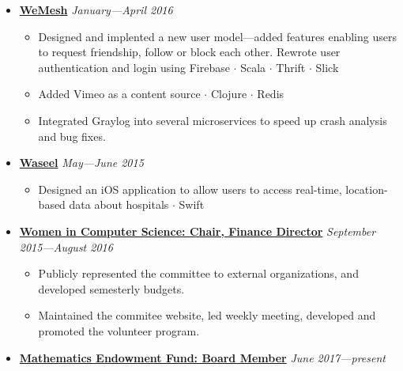 \documentclass[7pt,letterpaper]{article}
\newcommand{\dt}{$\cdot$ }
\begin{document}
\begin{itemize}
    \item[]
    {\href{http://www.rave.io}{\textbf{WeMesh}} \hfill
      \emph{January---April 2016}}

    \begin{itemize}[label=\textbullet]
      \itemsep0em
      \item Designed and implented a new user model---added features enabling
        users to request friendship, follow or block each other. Rewrote user
        authentication and login using Firebase \dt Scala \dt Thrift \dt Slick
      \item Added Vimeo as a content source \dt Clojure \dt Redis
      \item Integrated Graylog into several microservices to speed up crash
        analysis and bug fixes.
    \end{itemize}

    \item[]
    {\href{https://www.wasseel.com}{\textbf{Waseel}} \hfill
      \emph{May---June 2015}}

    \begin{itemize}[label=\textbullet]
      \itemsep0em
      \item Designed an iOS application to allow users to access real-time,
        location-based data about hospitals \dt Swift
    \end{itemize}
    
    \item[]
    {\href{http://wics.uwaterloo.ca}{\textbf{Women in Computer Science: Chair,
      Finance Director}} \hfill
      \emph{September 2015---August 2016}}

    \begin{itemize}[label=\textbullet]
      \itemsep0em
      \item Publicly represented the committee to external organizations, and
        developed semesterly budgets.
      \item Maintained the commitee website, led weekly meeting, developed and
        promoted the volunteer program.
    \end{itemize}

  \item[]
    {\href{https://uwaterloo.ca/math-endowment-fund/}{\textbf{Mathematics
    Endowment Fund: Board Member}} \hfill \emph{June 2017---present}}
  \end{itemize}
\end{document}
